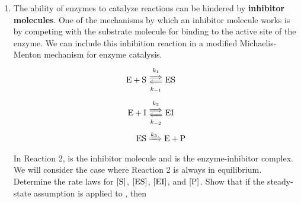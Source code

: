 \documentclass[../psets.tex]{subfiles}
\begin{document}
\begin{enumerate}[label={\textbf{29-\arabic*.}},leftmargin=3.5em]
\begin{proof}[Answer]
\begin{align*}
            \dv{\cnc{HBr}}{t} &= k_2\cnc{Br}\cnc{H2}-k_{-2}\cnc{HBr}\cnc{H}+k_3\cnc{H}\cnc{Br2}\\
            &= k_2\left( \frac{I_\text{abs}}{k_{-1}\NA} \right)^{1/2}\cnc{H2}-(k_{-2}\cnc{HBr}-k_3\cnc{Br2})\left( \frac{I_\text{abs}}{k_{-1}\NA} \right)^{1/2}\frac{k_2\cnc{H2}}{k_{-2}\cnc{HBr}+k_3\cnc{Br2}}\\
            &= k_2\left( \frac{I_\text{abs}}{k_{-1}\NA} \right)^{1/2}\cnc{H2}\left\{ 1-\frac{k_{-2}\cnc{HBr}-k_3\cnc{Br2}}{k_{-2}\cnc{HBr}+k_3\cnc{Br2}} \right\}\\
            &= k_2\left( \frac{I_\text{abs}}{k_{-1}\NA} \right)^{1/2}\cnc{H2}\left\{ \frac{k_{-2}\cnc{HBr}+k_3\cnc{Br2}}{k_{-2}\cnc{HBr}+k_3\cnc{Br2}}-\frac{k_{-2}\cnc{HBr}-k_3\cnc{Br2}}{k_{-2}\cnc{HBr}+k_3\cnc{Br2}} \right\}\\
            &= k_2\left( \frac{I_\text{abs}}{k_{-1}\NA} \right)^{1/2}\cnc{H2}\left\{ \frac{2k_3\cnc{Br2}}{k_{-2}\cnc{HBr}+k_3\cnc{Br2}} \right\}\\
            \Aboxed{\dv{\cnc{HBr}}{t} &= \left( \frac{I_\text{abs}}{k_{-1}\NA} \right)^{1/2}\frac{2k_2\cnc{H2}}{(k_{-2}/k_3)\cnc{HBr}/\cnc{Br2}+1}}
        \end{align*}
        where we have arranged the last expression so that every molar concentration and rate constant appears at most once, increasing the clarity with which the reader can see what's proportional to what.
    \end{proof}
    \item The ability of enzymes to catalyze reactions can be hindered by \textbf{inhibitor molecules}. One of the mechanisms by which an inhibitor molecule works is by competing with the substrate molecule for binding to the active site of the enzyme. We can include this inhibition reaction in a modified Michaelis-Menton mechanism for enzyme catalysis.
    \begin{align}
        \ce{E + S} &\Longleftrightarrows[k_1][k_{-1}] \ce{ES}\\
        \ce{E + I} &\Longleftrightarrows[k_2][k_{-2}] \ce{EI}\\
        \ce{ES} &\xRightarrow{k_3} \ce{E + P}
    \end{align}
    In Reaction 2,  is the inhibitor molecule and  is the enzyme-inhibitor complex. We will consider the case where Reaction 2 is always in equilibrium. Determine the rate laws for $\cnc{S}$, $\cnc{ES}$, $\cnc{EI}$, and $\cnc{P}$. Show that if the steady-state assumption is applied to , then

\end{enumerate}
\end{document}
